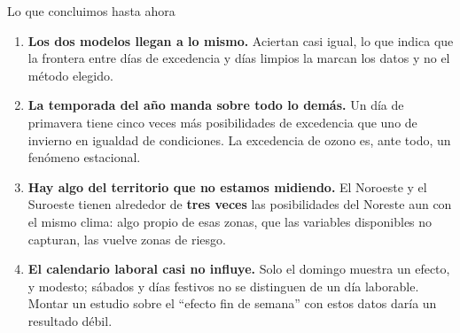 \documentclass{beamer}
\begin{document}
\begin{frame}{Lo que concluimos hasta ahora}
  \footnotesize

  \begin{enumerate}[label=\textbf{\roman*.},itemsep=6pt,topsep=2pt,parsep=0pt,leftmargin=*]
    \item \textbf{Los dos modelos llegan a lo mismo.} Aciertan casi igual,
      lo que indica que la frontera entre días de excedencia y días limpios
      la marcan los datos y no el método elegido.

    \item \textbf{La temporada del año manda sobre todo lo demás.} Un día
      de primavera tiene cinco veces más posibilidades de excedencia que
      uno de invierno en igualdad de condiciones. La excedencia de ozono es,
      ante todo, un fenómeno estacional.

    \item \textbf{Hay algo del territorio que no estamos midiendo.} El
      Noroeste y el Suroeste tienen alrededor de \textbf{tres veces} las
      posibilidades del Noreste aun con el mismo clima: algo propio de esas
      zonas, que las variables disponibles no capturan, las vuelve zonas de
      riesgo.

    \item \textbf{El calendario laboral casi no influye.} Solo el domingo
      muestra un efecto, y modesto; sábados y días festivos no se
      distinguen de un día laborable. Montar un estudio sobre el ``efecto
      fin de semana'' con estos datos daría un resultado débil.
  \end{enumerate}
\end{frame}
\end{document}
